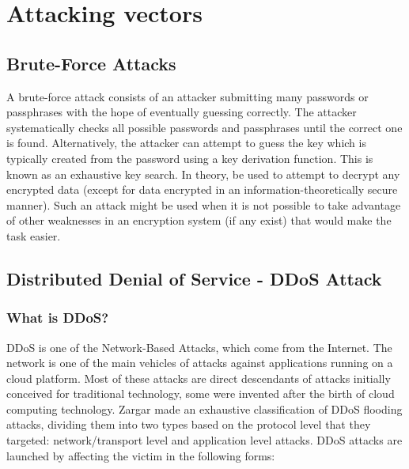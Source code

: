 \documentclass[twocolumn]{article}
\begin{document}
\section{Attacking vectors}
\subsection{Brute-Force Attacks}

A brute-force attack consists of an attacker submitting many passwords or passphrases with the hope of eventually guessing correctly.
The attacker systematically checks all possible passwords and passphrases until the correct one is found. Alternatively, the attacker can attempt to guess the key which is typically created from the password using a key derivation function.
This is known as an exhaustive key search.
In theory, be used to attempt to decrypt any encrypted data (except for data encrypted in an information-theoretically secure manner). Such an attack might be used when it is not possible to take advantage of other weaknesses in an encryption system (if any exist) that would make the task easier\cite{kanakam2022bruteforce}.
\subsection{Distributed Denial of Service - DDoS Attack}
\subsubsection{What is DDoS?}
\par DDoS \cite{coppolino2017cloud} is one of the Network-Based Attacks, which come from the Internet. The network is one of the main vehicles of attacks against applications running on a cloud platform. Most of these attacks are direct descendants of attacks initially conceived for traditional technology, some were invented after the birth of cloud computing technology. Zargar\cite{coppolino2017cloud} made an exhaustive classification of DDoS flooding attacks, dividing them into two types based on the protocol level that they targeted: network/transport level and application level attacks. DDoS attacks are launched by affecting the victim in the following forms:
\end{document}
